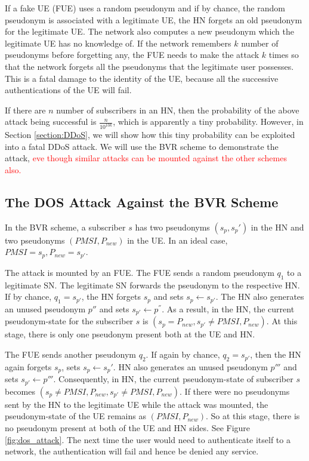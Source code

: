 \documentclass{llncs} %
\begin{document}
If a fake UE (FUE) uses a random pseudonym and if by chance, the random pseudonym is associated with a legitimate UE, the HN forgets an old pseudonym for the legitimate UE. The network also computes a new pseudonym which the legitimate UE has no knowledge of. If the network remembers  $k$ number of pseudonyms before forgetting any, the FUE needs to make the attack $k$ times so that the network forgets all the pseudonyms that the legitimate user possesses. This is a fatal damage to the identity of the UE, because all the successive authentications of the UE will fail. 

If there are $n$ number of subscribers in an HN, then the probability of the above attack being successful is $\frac{n}{10^{10k}}$, which is apparently a tiny probability. However, in Section \ref{section:DDoS}, we will show how this tiny probability can be exploited into a fatal DDoS attack. We will use the BVR scheme to demonstrate the attack, \textcolor{red}{eve though similar attacks can be mounted against the other schemes also.}


\subsection{The DOS Attack Against the BVR Scheme}
In the BVR scheme, a subscriber $s$ has two pseudonyms $\left(s_p,s_p'\right)$ in the HN and two pseudonyms $\left(PMSI,P_{new}\right)$ in the UE. In an ideal case, $PMSI = s_p, P_{new} = s_{p'}$. 

The attack is mounted by an FUE. The FUE sends a random pseudonym $q_1$ to a legitimate SN. The legitimate SN forwards the pseudonym to the respective HN. If by chance, $q_1 = s_{p'}$, the HN forgets $s_p$ and sets $s_p \leftarrow s_{p'}$. The HN also generates an unused pseudonym ${p''}$ and sets $s_{p'} \leftarrow p^{''}$. As a result, in the HN, the current  pseudonym-state for the subscriber $s$ is $\left(s_{p} = P_{new},s_{p'} \neq PMSI,P_{new}\right)$. At this stage, there is only one pseudonym present both at the UE and HN.

The FUE sends another pseudonym $q_2$. If again by chance, $q_2 = s_{p'}$, then the HN again forgets $s_{p}$, sets $s_p \leftarrow s_p'$. HN also generates an unused pseudonym $p'''$ and sets $s_{p'} \leftarrow p'''$. Consequently, in HN, the current pseudonym-state of subscriber $s$ becomes $\left(s_{p} \neq PMSI,P_{new},s_{p'} \neq PMSI,P_{new}\right)$. If there were no pseudonyms sent by the HN to the legitimate UE while the attack was mounted, the pseudonym-state of the UE remains as $\left(PMSI,P_{new}\right)$. So at this stage, there is no pseudonym present at both of the UE and HN sides. See Figure \ref{fig:dos_attack}. The next time the user would need to authenticate itself to a network, the authentication will fail and hence be denied any service.
\end{document}
